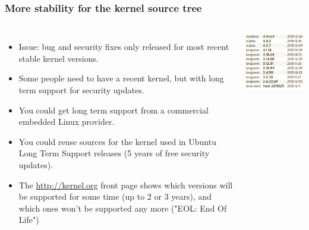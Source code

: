 \begin{frame}
  \frametitle{More stability for the kernel source tree}
  \begin{columns}
    \begin{itemize}
    \item Issue: bug and security fixes only released for most recent
      stable kernel versions.
    \item Some people need to have a recent kernel, but with long term
      support for security updates.
    \item You could get long term support from a commercial embedded
      Linux provider.
    \item You could reuse sources for the kernel used in Ubuntu Long
      Term Support releases (5 years of free security updates).
    \item The \url{http://kernel.org} front page shows which
      versions will be supported for some time (up to 2 or 3 years),
      and which ones won't be supported any more ("EOL: End Of Life")
    \end{itemize}
    \includegraphics[width=\textwidth]{slides/sysdev-linux-intro-versioning/longterm-versions.png}
  \end{columns}
\end{frame}

